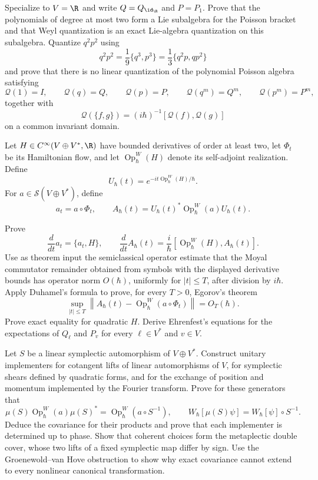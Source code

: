 \begin{exercise}
Specialize to $V=\R$ and write $Q=Q_{\id_\R}$ and $P=P_1$.
Prove that the polynomials of degree at most two form a Lie subalgebra for
the Poisson bracket and that Weyl quantization is an exact Lie-algebra
quantization on this subalgebra.  Quantize $q^2p^2$ using
\[
q^2p^2=\frac19\{q^3,p^3\}
=\frac13\{q^2p,qp^2\}
\]
and prove that there is no linear quantization of the polynomial Poisson
algebra satisfying
\[
\mathcal Q(1)=I,\qquad
\mathcal Q(q)=Q,\qquad
\mathcal Q(p)=P,\qquad
\mathcal Q(q^m)=Q^m,\qquad
\mathcal Q(p^m)=P^m,
\]
together with
\[
\mathcal Q(\{f,g\})=(i\hbar)^{-1}
[\mathcal Q(f),\mathcal Q(g)]
\]
on a common invariant domain.
\end{exercise}


\begin{exercise}
Let $H\in C^\infty(V\oplus V^*,\R)$ have bounded derivatives of order at least
two, let $\Phi_t$ be its Hamiltonian flow, and let
$\operatorname{Op}_\hbar^W(H)$ denote its self-adjoint realization.  Define
\[
U_\hbar(t)=e^{-it\operatorname{Op}_\hbar^W(H)/\hbar}.
\]
For $a\in\mathcal S(V\oplus V^*)$, define
\[
a_t=a\circ\Phi_t,
\qquad
A_\hbar(t)=U_\hbar(t)^*\operatorname{Op}_\hbar^W(a)U_\hbar(t).
\]

Prove
\[
\frac{d}{dt}a_t=\{a_t,H\},
\qquad
\frac{d}{dt}A_\hbar(t)
=\frac{i}{\hbar}
[\operatorname{Op}_\hbar^W(H),A_\hbar(t)].
\]
Use as theorem input the semiclassical operator estimate that the Moyal
commutator remainder obtained from symbols with the displayed derivative
bounds has operator norm $O(\hbar)$, uniformly for $|t|\leq T$, after
division by $i\hbar$.  Apply Duhamel's formula to prove, for every $T>0$,
Egorov's theorem
\[
\sup_{|t|\leq T}
\left\|
A_\hbar(t)-\operatorname{Op}_\hbar^W(a\circ\Phi_t)
\right\|=O_T(\hbar).
\]
Prove exact equality for quadratic $H$.  Derive Ehrenfest's equations for
the expectations of $Q_\ell$ and $P_v$ for every $\ell\in V^*$ and
$v\in V$.
\end{exercise}

\begin{exercise}
Let $S$ be a linear symplectic automorphism of $V\oplus V^*$.  Construct
unitary implementers for cotangent lifts of linear automorphisms of $V$,
for symplectic shears defined by quadratic forms, and for the exchange of
position and momentum implemented by the Fourier transform.  Prove for
these generators that
\[
\mu(S)\operatorname{Op}_\hbar^W(a)\mu(S)^*
=\operatorname{Op}_\hbar^W(a\circ S^{-1}),
\qquad
W_\hbar[\mu(S)\psi]=W_\hbar[\psi]\circ S^{-1}.
\]
Deduce the covariance for their products and prove that each implementer is
determined up to phase.  Show that coherent choices form the metaplectic
double cover, whose two lifts of a fixed symplectic map differ by sign.  Use
the Groenewold--van Hove obstruction to show why exact covariance cannot
extend to every nonlinear canonical transformation.
\end{exercise}

